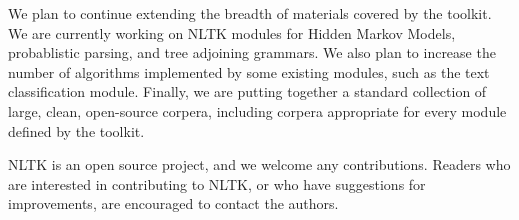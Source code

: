 \documentclass[11pt]{article}
\begin{document}

We plan to continue extending the breadth of materials covered by the
toolkit.  We are currently working on NLTK modules for Hidden Markov
Models, probablistic parsing, and tree adjoining grammars.  We also
plan to increase the number of algorithms implemented by some existing
modules, such as the text classification module.  Finally, we are
putting together a standard collection of large, clean, open-source
corpera, including corpera appropriate for every module defined by the
toolkit.

NLTK is an open source project, and we welcome any contributions.
Readers who are interested in contributing to NLTK, or who have
suggestions for improvements, are encouraged to contact the authors.




\end{document}
